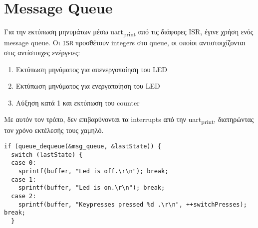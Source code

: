 \documentclass[11pt]{article}
\begin{document}
\section{Message Queue}
\label{sec:org3847045}
Για την εκτύπωση μηνυμάτων μέσω uart\textsubscript{print} από τις διάφορες ISR, έγινε
χρήση ενός message queue. Οι \texttt{ISR} προσθέτουν integers στο queue, οι
οποίοι αντιστοιχίζονται στις αντίστοιχες ενέργειες:
\begin{enumerate}
\item Εκτύπωση μηνύματος για απενεργοποίηση του LED
\item Εκτύπωση μηνύματος για ενεργοποίηση του LED
\item Αύξηση κατά 1 και εκτύπωση του counter
\end{enumerate}
Με αυτόν τον τρόπο, δεν επιβαρύνονται τα interrupts από την uart\textsubscript{print}, διατηρώντας τον χρόνο εκτέλεσής τους χαμηλό.

\begin{verbatim}
if (queue_dequeue(&msg_queue, &lastState)) {
  switch (lastState) {
  case 0:
    sprintf(buffer, "Led is off.\r\n"); break;
  case 1:
    sprintf(buffer, "Led is on.\r\n"); break;
  case 2:
    sprintf(buffer, "Keypresses pressed %d .\r\n", ++switchPresses); break;
  }
\end{verbatim}
\end{document}
